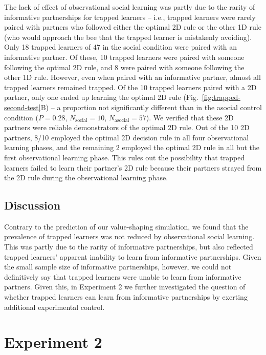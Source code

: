 \documentclass[11pt]{article} %
\begin{document}
The lack of effect of observational social learning was partly due to the rarity of informative partnerships for trapped learners -- i.e., trapped learners were rarely paired with partners who followed either the optimal 2D rule or the other 1D rule (who would approach the bee that the trapped learner is mistakenly avoiding). Only 18 trapped learners of 47 in the social condition were paired with an informative partner. Of these, 10 trapped learners were paired with someone following the optimal 2D rule, and 8 were paired with someone following the other 1D rule. However, even when paired with an informative partner, almost all trapped learners remained trapped. Of the 10 trapped learners paired with a 2D partner, only one ended up learning the optimal 2D rule (Fig.~\ref{fig:trapped-second-test}B) -- a proportion not significantly different than in the asocial control condition ($P=0.28$, $N_{\text{social}} = 10$, $N_{\text{asocial}} = 57$). We verified that these 2D partners were reliable demonstrators of the optimal 2D rule. Out of the 10 2D partners, 8/10 employed the optimal 2D decision rule in all four observational learning phases, and the remaining 2 employed the optimal 2D rule in all but the first observational learning phase. This rules out the possibility that trapped learners failed to learn their partner's 2D rule because their partners strayed from the 2D rule during the observational learning phase.

\subsection{Discussion}

Contrary to the prediction of our value-shaping simulation, we found that the prevalence of trapped learners was not reduced by observational social learning. This was partly due to the rarity of informative partnerships, but also reflected trapped learners' apparent inability to learn from informative partnerships. Given the small sample size of informative partnerships, however, we could not definitively say that trapped learners were unable to learn from informative partners. Given this, in Experiment 2 we further investigated the question of whether trapped learners can learn from informative partnerships by exerting additional experimental control.



\section{Experiment 2}
\end{document}
